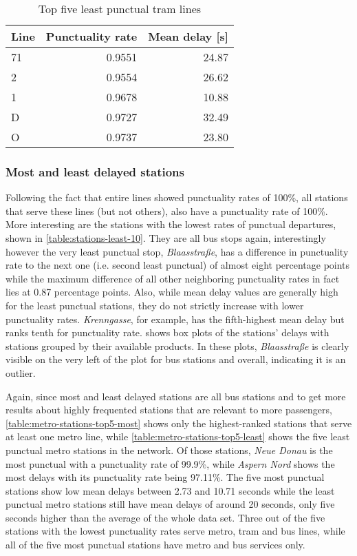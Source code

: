 \begin{table}
	\centering
	\begin{tabular}{lrr}
		\toprule
		Line & Punctuality rate & Mean delay [s] \\
		\midrule
		71 &  0.9551 & 24.87 \\
		2 &   0.9554 & 26.62 \\
		1 &   0.9678 & 10.88 \\
		D &   0.9727 & 32.49 \\
		O &   0.9737 & 23.80 \\
		\bottomrule
	\end{tabular}
	\caption{Top five least punctual tram lines}
	\label{table:tram-top5-least}
\end{table}

\subsubsection{Most and least delayed stations}

Following the fact that entire lines showed punctuality rates of 100\%, all stations that serve these lines (but not others), also have a punctuality rate of 100\%. More interesting are the stations with the lowest rates of punctual departures, shown in \cref{table:stations-least-10}. They are all bus stops again, interestingly however the very least punctual stop, \textit{Blaasstraße}, has a difference in punctuality rate to the next one (i.e. second least punctual) of almost eight percentage points while the maximum difference of all other neighboring punctuality rates in fact lies at 0.87 percentage points. Also, while mean delay values are generally high for the least punctual stations, they do not strictly increase with lower punctuality rates. \textit{Krenngasse}, for example, has the fifth-highest mean delay but ranks tenth for punctuality rate.  shows box plots of the stations' delays with stations grouped by their available products. In these plots, \textit{Blaasstraße} is clearly visible on the very left of the plot for bus stations and overall, indicating it is an outlier.

Again, since most and least delayed stations are all bus stations and to get more results about highly frequented stations that are relevant to more passengers, \cref{table:metro-stations-top5-most} shows only the highest-ranked stations that serve at least one metro line, while \cref{table:metro-stations-top5-least} shows the five least punctual metro stations in the network. Of those stations, \textit{Neue Donau} is the most punctual with a punctuality rate of 99.9\%, while \textit{Aspern Nord} shows the most delays with its punctuality rate being 97.11\%. The five most punctual stations show low mean delays between 2.73 and 10.71 seconds while the least punctual metro stations still have mean delays of around 20 seconds, only five seconds higher than the average of the whole data set. Three out of the five stations with the lowest punctuality rates serve metro, tram and bus lines, while all of the five most punctual stations have metro and bus services only.

